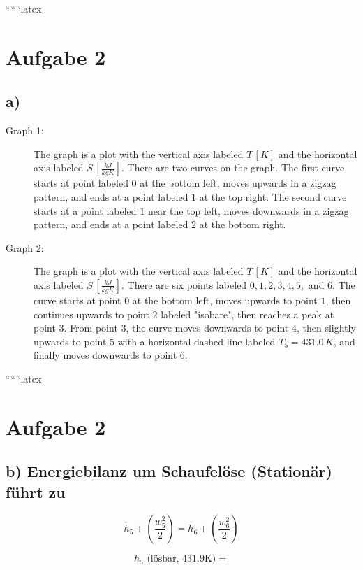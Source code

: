 
``````latex


\section*{Aufgabe 2}

\subsection*{a)}

\begin{description}
    \item[Graph 1:] The graph is a plot with the vertical axis labeled \( T \, [K] \) and the horizontal axis labeled \( S \, \left[ \frac{kJ}{kgK} \right] \). There are two curves on the graph. The first curve starts at point labeled \( 0 \) at the bottom left, moves upwards in a zigzag pattern, and ends at a point labeled \( 1 \) at the top right. The second curve starts at a point labeled \( 1 \) near the top left, moves downwards in a zigzag pattern, and ends at a point labeled \( 2 \) at the bottom right.
    
    \item[Graph 2:] The graph is a plot with the vertical axis labeled \( T \, [K] \) and the horizontal axis labeled \( S \, \left[ \frac{kJ}{kgK} \right] \). There are six points labeled \( 0, 1, 2, 3, 4, 5, \) and \( 6 \). The curve starts at point \( 0 \) at the bottom left, moves upwards to point \( 1 \), then continues upwards to point \( 2 \) labeled "isobare", then reaches a peak at point \( 3 \). From point \( 3 \), the curve moves downwards to point \( 4 \), then slightly upwards to point \( 5 \) with a horizontal dashed line labeled \( T_5 = 431.0 \, K \), and finally moves downwards to point \( 6 \).
\end{description}

``````latex


\section*{Aufgabe 2}

\subsection*{b) Energiebilanz um Schaufelöse (Stationär) führt zu}

\[
h_5 + \left( \frac{w_5^2}{2} \right) = h_6 + \left( \frac{w_6^2}{2} \right)
\]

\[
h_5 \text{ (lösbar, 431.9K)} = 
\]

